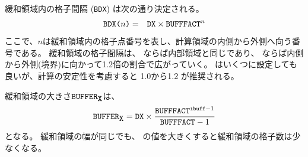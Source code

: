 緩和領域内の格子間隔 (\verb|BDX|) は次の通り決定される。
\begin{eqnarray}
 \verb|BDX(|n\verb|)| &=& \verb|DX| \times \verb|BUFFFACT|^n \nonumber
\end{eqnarray}
ここで、$n$は緩和領域内の格子点番号を表し、計算領域の内側から外側へ向う番号である。
緩和領域の格子間隔は、
ならば内部領域と同じであり、
ならば内側から外側(境界)に向かって1.2倍の割合で広がっていく。
はいくつに設定しても良いが、計算の安定性を考慮すると 1.0から1.2 が推奨される。


緩和領域の大きさ$\verb|BUFFER|_{\verb|X|}$は、
\[
  \verb|BUFFER|_{\verb|X|} = \nmitemeq{DX} \times \frac{ \nmitemeq{BUFFFACT}^{\texttt{\detokenize{ibuff}}-1 }}{ \nmitemeq{BUFFFACT}-1 }
\]
となる。
%
緩和領域の幅が同じでも、
の値を大きくすると緩和領域の格子数は少なくなる。

~\\
\\
~\\
